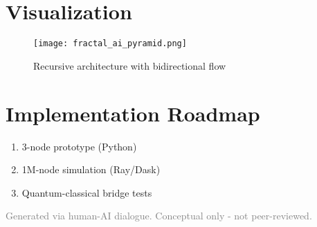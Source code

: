 \documentclass{article}
\begin{document}
\section*{Visualization}
\begin{figure}[h]
\centering
\texttt{[image: fractal\_ai\_pyramid.png]}
\caption{Recursive architecture with bidirectional flow}
\end{figure}

\section*{Implementation Roadmap}
\begin{enumerate}
\item 3-node prototype (Python)
\item 1M-node simulation (Ray/Dask)
\item Quantum-classical bridge tests
\end{enumerate}

\footnotesize
\textcolor{gray}{Generated via human-AI dialogue. Conceptual only - not peer-reviewed.}
\end{document}
